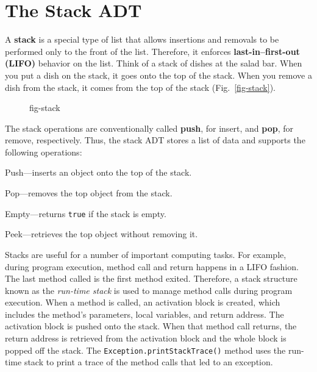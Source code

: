 \section{The Stack ADT}
\label{the-stack-adt}

\noindent A {\bf stack} is a special type of list that 
allows insertions and
removals to be performed only to the front of the list.  Therefore, it enforces {\bf
last-in--first-out (LIFO)} behavior 
on the list.  Think of a stack of
dishes at the salad bar.
When you put a dish on the stack, it goes onto the top of the stack.
When you remove a dish from the stack, it comes from the top of the
stack  (Fig.~\ref{fig-stack}).  

\begin{figure}[thb]
 {fig-stack}
\end{figure}

The stack operations are conventionally called {\bf push},
for insert, and {\bf pop}, for remove, respectively.  Thus,
the stack ADT stores a list of data and supports the following
operations:

\begin{BL}
\item  Push---inserts an object onto the top of the stack.
\item  Pop---removes the top object from the stack.
\item  Empty---returns {\tt true} if the stack is empty.
\item  Peek---retrieves the top object without removing it.
\end{BL}

Stacks are useful for a number of important computing tasks.  For
 example, during program execution,
method call and return happens in a LIFO fashion.  The last method
called is the first method exited.  Therefore, a stack structure known
as the {\em run-time stack} is used to manage method calls during
program execution.  When a method is called, an activation block is
created, which includes the method's parameters, local variables, and
return address.  The activation block is pushed onto the stack.  When
that method call returns, the return address is retrieved from the
activation block and the whole block is popped off the stack.  The
{\tt Exception.printStackTrace()} method uses the run-time stack to
print a trace of the method calls that led to an exception.

